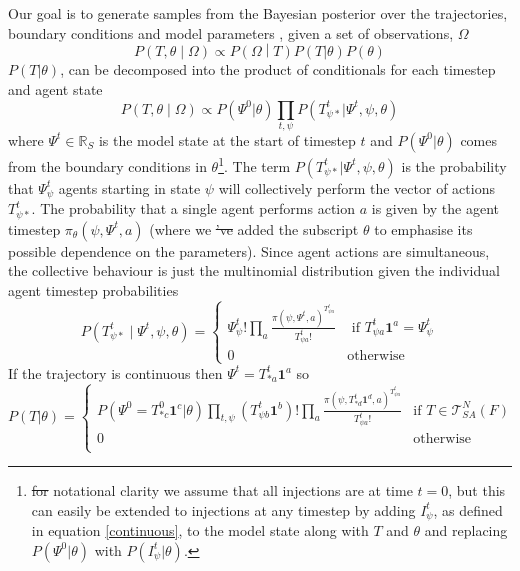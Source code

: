 \documentclass{article}
\providecommand{\DIFaddtex}[1]{{\protect\color{blue}\uwave{#1}}} %
\providecommand{\DIFdeltex}[1]{{\protect\color{red}\sout{#1}}}                      %
\providecommand{\DIFaddbegin}{} %
\providecommand{\DIFaddend}{} %
\providecommand{\DIFdelbegin}{} %
\providecommand{\DIFdelend}{} %
\providecommand{\DIFadd}[1]{\texorpdfstring{\DIFaddtex{#1}}{#1}} %
\providecommand{\DIFdel}[1]{\texorpdfstring{\DIFdeltex{#1}}{}} %
\newcommand{\DIFscaledelfig}{0.5}
\newlength{\DIFdelgraphicswidth} %
\newlength{\DIFdelgraphicsheight} %
\newcommand{\DIFaddincludegraphics}[2][]{{\color{blue}\fbox{\DIFOincludegraphics[#1]{#2}}}} %
\newcommand{\DIFdelincludegraphics}[2][]{%
\sbox{\DIFdelgraphicsbox}{\DIFOincludegraphics[#1]{#2}}%
\settoboxwidth{\DIFdelgraphicswidth}{\DIFdelgraphicsbox} %
\settoboxtotalheight{\DIFdelgraphicsheight}{\DIFdelgraphicsbox} %
\scalebox{\DIFscaledelfig}{%
\parbox[b]{\DIFdelgraphicswidth}{\usebox{\DIFdelgraphicsbox}\\[-\baselineskip] \rule{\DIFdelgraphicswidth}{0em}}\llap{\resizebox{\DIFdelgraphicswidth}{\DIFdelgraphicsheight}{%
\setlength{\unitlength}{\DIFdelgraphicswidth}%
\begin{picture}(1,1)%
\thicklines\linethickness{2pt} %
{\color[rgb]{1,0,0}\put(0,0){\framebox(1,1){}}}%
{\color[rgb]{1,0,0}\put(0,0){\line( 1,1){1}}}%
{\color[rgb]{1,0,0}\put(0,1){\line(1,-1){1}}}%
\end{picture}%
}\hspace*{3pt}}} %
} %
\DeclareRobustCommand{\DIFaddbegin}{\DIFOaddbegin \let\includegraphics\DIFaddincludegraphics} %
\DeclareRobustCommand{\DIFaddend}{\DIFOaddend \let\includegraphics\DIFOincludegraphics} %
\DeclareRobustCommand{\DIFdelbegin}{\DIFOdelbegin \let\includegraphics\DIFdelincludegraphics} %
\DeclareRobustCommand{\DIFdelend}{\DIFOaddend \let\includegraphics\DIFOincludegraphics} %
\begin{document}
Our goal is to generate samples from the Bayesian posterior over the trajectories, \DIFaddbegin \DIFadd{$T$, }\DIFaddend boundary conditions and model parameters \DIFaddbegin \DIFadd{$\theta$}\DIFaddend , given a set of observations, $\Omega$
\[
P\left(T,\theta \middle| \Omega\right) \propto P\left(\Omega \middle| T\right)P(T|\theta)P(\theta)
\]
$P(T|\theta)$, can be decomposed into the product of conditionals for each timestep and agent state
\[
P\left(T,\theta \middle| \Omega\right) \propto  P(\Psi^0|\theta) \prod_{t,\psi} P(T^t_{\psi *} | \Psi^t,\psi,\theta)
\]
where $\Psi^t\in\mathbb{R}_S$ is the model state at the start of timestep $t$ and $P(\Psi^0|\theta)$ comes from the boundary conditions in $\theta$\footnote{\DIFdelbegin \DIFdel{for }\DIFdelend \DIFaddbegin \DIFadd{For }\DIFaddend notational clarity we assume that all injections are at time $t=0$, but this can easily be extended to injections at any timestep by adding $I^t_\psi$, as defined in equation \eqref{continuous}, to the model state along with $T$ and $\theta$ and replacing $P(\Psi^0|\theta)$ with $P(I^t_\psi|\theta)$.}.  The term $P(T^t_{\psi *} | \Psi^t,\psi,\theta)$ is the probability that $\Psi^t_\psi$ agents starting in state $\psi$ will collectively perform the vector of actions $T^t_{\psi *}$. The probability that a single agent performs action $a$ is given by the agent timestep $\pi_\theta(\psi,\Psi^t,a)$ (where we \DIFdelbegin \DIFdel{'ve }\DIFdelend \DIFaddbegin \DIFadd{have }\DIFaddend added the subscript $\theta$ to emphasise its possible dependence on the parameters). Since agent actions are simultaneous, the collective behaviour is just the multinomial distribution given the individual agent timestep probabilities
\begin{equation}
P\left(T^t_{\psi *} \mid \Psi^t, \psi, \theta\right) = 
\begin{cases}
\Psi^t_\psi!\prod_a \frac{\pi(\psi,\Psi^t,a)^{T^t_{\psi a}}}{T^t_{\psi a}!} & \text{ if } T^t_{\psi a}\mathbf{1}^a = \Psi^t_\psi \\
0 & \text{otherwise}
\end{cases}
\end{equation}
If the trajectory is continuous then $\Psi^t = T^t_{* a}\mathbf{1}^a$ so 
\begin{equation}
P(T|\theta) =
\begin{cases}
P(\Psi^0 = T^0_{* c}\mathbf{1}^c|\theta)
\prod_{t, \psi} \left(T^t_{\psi b} \mathbf{1}^b \right)!
\prod_{a} \frac{\pi(\psi, T^{t}_{* d}\mathbf{1}^d,a)^{T^{t}_{\psi a}}}{T^{t}_{\psi a}!} & \text{if } T \in \mathcal{T}^N_{SA}(F) \\
0 & \text{otherwise}\\
\end{cases}
\label{priorTrajectory}
\end{equation}
\end{document}
